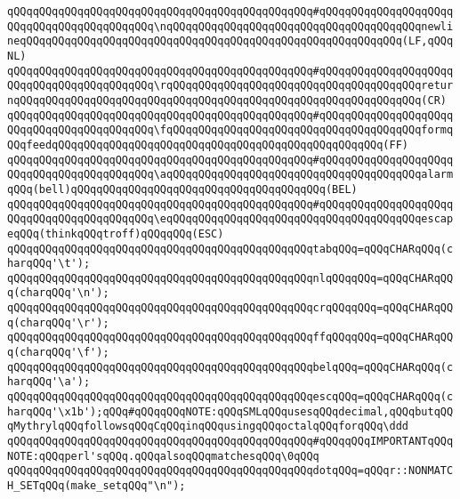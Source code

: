 \verb|qQQqqQQqqQQqqQQqqQQqqQQqqQQqqQQqqQQqqQQqqQQqqQQq#qQQqqQQqqQQqqQQqqQQqqQQqqQQqqQQqqQQqqQQqqQQq\nqQQqqQQqqQQqqQQqqQQqqQQqqQQqqQQqqQQqqQQqnewlineqQQqqQQqqQQqqQQqqQQqqQQqqQQqqQQqqQQqqQQqqQQqqQQqqQQqqQQqqQQq(LF,qQQqNL)|\newline
\verb|qQQqqQQqqQQqqQQqqQQqqQQqqQQqqQQqqQQqqQQqqQQqqQQq#qQQqqQQqqQQqqQQqqQQqqQQqqQQqqQQqqQQqqQQqqQQq\rqQQqqQQqqQQqqQQqqQQqqQQqqQQqqQQqqQQqqQQqreturnqQQqqQQqqQQqqQQqqQQqqQQqqQQqqQQqqQQqqQQqqQQqqQQqqQQqqQQqqQQqqQQq(CR)|\newline
\verb|qQQqqQQqqQQqqQQqqQQqqQQqqQQqqQQqqQQqqQQqqQQqqQQq#qQQqqQQqqQQqqQQqqQQqqQQqqQQqqQQqqQQqqQQqqQQq\fqQQqqQQqqQQqqQQqqQQqqQQqqQQqqQQqqQQqqQQqformqQQqfeedqQQqqQQqqQQqqQQqqQQqqQQqqQQqqQQqqQQqqQQqqQQqqQQqqQQq(FF)|\newline
\verb|qQQqqQQqqQQqqQQqqQQqqQQqqQQqqQQqqQQqqQQqqQQqqQQq#qQQqqQQqqQQqqQQqqQQqqQQqqQQqqQQqqQQqqQQqqQQq\aqQQqqQQqqQQqqQQqqQQqqQQqqQQqqQQqqQQqqQQqalarmqQQq(bell)qQQqqQQqqQQqqQQqqQQqqQQqqQQqqQQqqQQqqQQq(BEL)|\newline
\verb|qQQqqQQqqQQqqQQqqQQqqQQqqQQqqQQqqQQqqQQqqQQqqQQq#qQQqqQQqqQQqqQQqqQQqqQQqqQQqqQQqqQQqqQQqqQQq\eqQQqqQQqqQQqqQQqqQQqqQQqqQQqqQQqqQQqqQQqescapeqQQq(thinkqQQqtroff)qQQqqQQq(ESC)|\newline
\newline
\newline
\verb|qQQqqQQqqQQqqQQqqQQqqQQqqQQqqQQqqQQqqQQqqQQqqQQqtabqQQq=qQQqCHARqQQq(charqQQq'\t');|\newline
\verb|qQQqqQQqqQQqqQQqqQQqqQQqqQQqqQQqqQQqqQQqqQQqqQQqnlqQQqqQQq=qQQqCHARqQQq(charqQQq'\n');|\newline
\verb|qQQqqQQqqQQqqQQqqQQqqQQqqQQqqQQqqQQqqQQqqQQqqQQqcrqQQqqQQq=qQQqCHARqQQq(charqQQq'\r');|\newline
\verb|qQQqqQQqqQQqqQQqqQQqqQQqqQQqqQQqqQQqqQQqqQQqqQQqffqQQqqQQq=qQQqCHARqQQq(charqQQq'\f');|\newline
\verb|qQQqqQQqqQQqqQQqqQQqqQQqqQQqqQQqqQQqqQQqqQQqqQQqbelqQQq=qQQqCHARqQQq(charqQQq'\a');|\newline
\verb|qQQqqQQqqQQqqQQqqQQqqQQqqQQqqQQqqQQqqQQqqQQqqQQqescqQQq=qQQqCHARqQQq(charqQQq'\x1b');qQQq#qQQqqQQqNOTE:qQQqSMLqQQqusesqQQqdecimal,qQQqbutqQQqMythrylqQQqfollowsqQQqCqQQqinqQQqusingqQQqoctalqQQqforqQQq\ddd|\newline
\newline
\verb|qQQqqQQqqQQqqQQqqQQqqQQqqQQqqQQqqQQqqQQqqQQqqQQq#qQQqqQQqIMPORTANTqQQqNOTE:qQQqperl'sqQQq.qQQqalsoqQQqmatchesqQQq\0qQQq|\newline
\verb|qQQqqQQqqQQqqQQqqQQqqQQqqQQqqQQqqQQqqQQqqQQqqQQqdotqQQq=qQQqr::NONMATCH_SETqQQq(make_setqQQq"\n");|\newline
